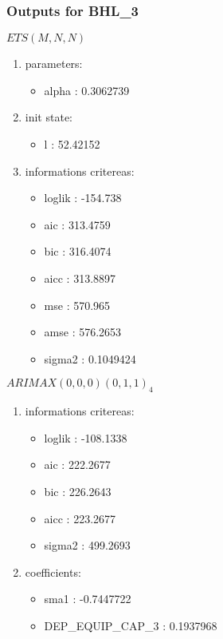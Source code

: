 \documentclass[10pt,a4paper]{article}\usepackage[]{graphicx}\usepackage[]{color}
\newcommand{\AaA}{\_}
\begin{document}
\subsubsection{Outputs for BHL\AaA 3}
\begin{multicols}{2}


$ ETS(M,N,N) $
\begin{enumerate}
\item parameters:
\begin{itemize}
\item  alpha :  0.3062739 
\end{itemize}
\item init state:
\begin{itemize}
\item  l :  52.42152 
\end{itemize}
\item informations critereas:
\begin{itemize}
\item  loglik :  -154.738 
\item  aic :  313.4759 
\item  bic :  316.4074 
\item  aicc :  313.8897 
\item  mse :  570.965 
\item  amse :  576.2653 
\item  sigma2 :  0.1049424 
\end{itemize}
\end{enumerate}

\columnbreak


 $ARIMAX(0,0,0)(0,1,1)_{4}$ 
\begin{enumerate}
\item informations critereas:
\begin{itemize}
\item  loglik :  -108.1338 
\item  aic :  222.2677 
\item  bic :  226.2643 
\item  aicc :  223.2677 
\item  sigma2 :  499.2693 
\end{itemize}

\item coefficients:
\begin{itemize}
\item  sma1 :  -0.7447722 
\item  DEP\AaA EQUIP\AaA CAP\AaA 3 :  0.1937968 
\end{itemize}
\end{enumerate}
\end{multicols}
\end{document}
